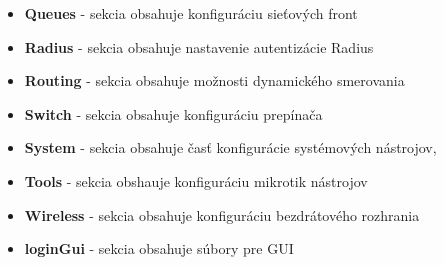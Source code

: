 \begin{itemize}
\item \textbf{Queues} - sekcia obsahuje konfiguráciu sieťových front
\item \textbf{Radius} - sekcia obsahuje nastavenie autentizácie Radius 
\item \textbf{Routing} - sekcia obsahuje možnosti dynamického smerovania 
\item \textbf{Switch} - sekcia obsahuje konfiguráciu prepínača
\item \textbf{System} - sekcia obsahuje časť konfigurácie systémových nástrojov,
\item \textbf{Tools} - sekcia obshauje konfiguráciu mikrotik nástrojov
\item \textbf{Wireless} - sekcia obsahuje konfiguráciu bezdrátového rozhrania
\item \textbf{loginGui} - sekcia obsahuje súbory pre GUI
\end{itemize}
